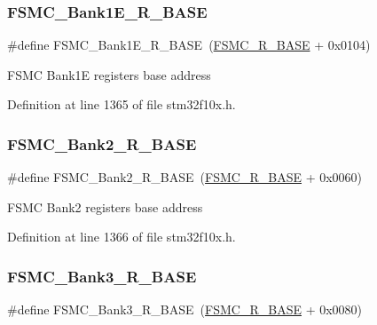 \subsubsection{\texorpdfstring{F\+S\+M\+C\+\_\+\+Bank1\+E\+\_\+\+R\+\_\+\+B\+A\+SE}{FSMC\_Bank1E\_R\_BASE}}
{\footnotesize\ttfamily \#define F\+S\+M\+C\+\_\+\+Bank1\+E\+\_\+\+R\+\_\+\+B\+A\+SE~(\hyperlink{group___peripheral__memory__map_gaddf0e199dccba83272b20c9fb4d3aaed}{F\+S\+M\+C\+\_\+\+R\+\_\+\+B\+A\+SE} + 0x0104)}

F\+S\+MC Bank1E registers base address 

Definition at line 1365 of file stm32f10x.\+h.

\mbox{\label{group___peripheral__memory__map_ga3cb46d62f4f6458e186a5a4c753e4918}} 
\subsubsection{\texorpdfstring{F\+S\+M\+C\+\_\+\+Bank2\+\_\+\+R\+\_\+\+B\+A\+SE}{FSMC\_Bank2\_R\_BASE}}
{\footnotesize\ttfamily \#define F\+S\+M\+C\+\_\+\+Bank2\+\_\+\+R\+\_\+\+B\+A\+SE~(\hyperlink{group___peripheral__memory__map_gaddf0e199dccba83272b20c9fb4d3aaed}{F\+S\+M\+C\+\_\+\+R\+\_\+\+B\+A\+SE} + 0x0060)}

F\+S\+MC Bank2 registers base address 

Definition at line 1366 of file stm32f10x.\+h.

\mbox{\label{group___peripheral__memory__map_gacf056152c9e5aefcc67db78d1302c0d7}} 
\subsubsection{\texorpdfstring{F\+S\+M\+C\+\_\+\+Bank3\+\_\+\+R\+\_\+\+B\+A\+SE}{FSMC\_Bank3\_R\_BASE}}
{\footnotesize\ttfamily \#define F\+S\+M\+C\+\_\+\+Bank3\+\_\+\+R\+\_\+\+B\+A\+SE~(\hyperlink{group___peripheral__memory__map_gaddf0e199dccba83272b20c9fb4d3aaed}{F\+S\+M\+C\+\_\+\+R\+\_\+\+B\+A\+SE} + 0x0080)}

